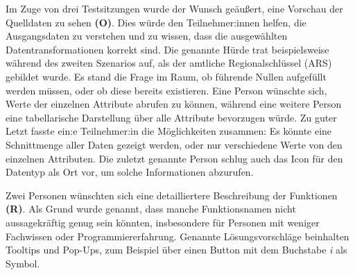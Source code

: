 Im Zuge von drei Testsitzungen wurde der Wunsch geäußert, eine Vorschau der Quelldaten zu sehen \textbf{(O)}. Dies würde den Teilnehmer:innen helfen, die Ausgangsdaten zu verstehen und zu wissen, dass die ausgewählten Datentransformationen korrekt sind. Die genannte Hürde trat beispielsweise während des zweiten Szenarios auf, als der amtliche Regionalschlüssel (\acs{ARS}) gebildet wurde. Es stand die Frage im Raum, ob führende Nullen aufgefüllt werden müssen, oder ob diese bereits existieren. Eine Person wünschte sich, Werte der einzelnen Attribute abrufen zu können, während eine weitere Person eine tabellarische Darstellung über alle Attribute bevorzugen würde. Zu guter Letzt fasste ein:e Teilnehmer:in die Möglichkeiten zusammen: Es könnte eine Schnittmenge aller Daten gezeigt werden, oder nur verschiedene Werte von den einzelnen Attributen. Die zuletzt genannte Person schlug auch das Icon für den Datentyp als Ort vor, um solche Informationen abzurufen.

Zwei Personen wünschten sich eine detailliertere Beschreibung der Funktionen \textbf{(R)}. Als Grund wurde genannt, dass manche Funktionsnamen nicht aussagekräftig genug sein könnten, insbesondere für Personen mit weniger Fachwissen oder Programmiererfahrung. Genannte Lösungsvorschläge beinhalten Tooltips und Pop-Ups, zum Beispiel über einen Button mit dem Buchstabe \textit{i} als Symbol.

